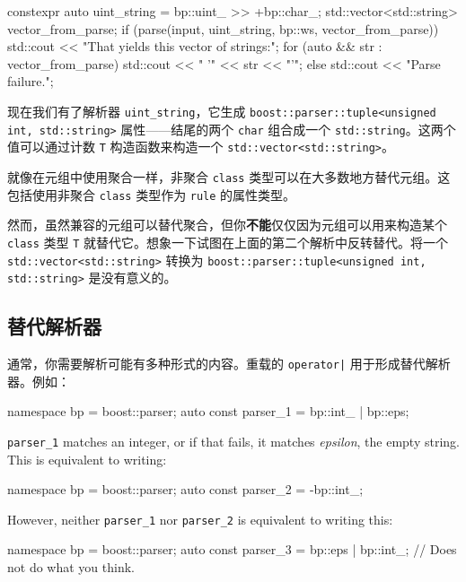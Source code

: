 \begin{code}
constexpr auto uint_string = bp::uint_ >> +bp::char_;
std::vector<std::string> vector_from_parse;
if (parse(input, uint_string, bp::ws, vector_from_parse)) {
    std::cout << "That yields this vector of strings:\n";
    for (auto && str : vector_from_parse) {
        std::cout << "  '" << str << "'\n";
    }
} else {
    std::cout << "Parse failure.\n";
}
\end{code}

现在我们有了解析器 \texttt{uint\_string}，它生成 \texttt{boost::parser::tuple<unsigned int, std::string>} 属性——结尾的两个 \texttt{char} 组合成一个 \texttt{std::string}。这两个值可以通过计数 \texttt{T} 构造函数来构造一个 \texttt{std::vector<std::string>}。

就像在元组中使用聚合一样，非聚合 \texttt{class} 类型可以在大多数地方替代元组。这包括使用非聚合 \texttt{class} 类型作为 \texttt{rule} 的属性类型。

然而，虽然兼容的元组可以替代聚合，但你\textbf{不能}仅仅因为元组可以用来构造某个 \texttt{class} 类型 \texttt{T} 就替代它。想象一下试图在上面的第二个解析中反转替代。将一个 \texttt{std::vector<std::string>} 转换为 \texttt{boost::parser::tuple<unsigned int, std::string>} 是没有意义的。

\subsection{替代解析器}

通常，你需要解析可能有多种形式的内容。重载的 \texttt{operator|} 用于形成替代解析器。例如：

\begin{code}
namespace bp = boost::parser;
auto const parser_1 = bp::int_ | bp::eps;
\end{code}

\texttt{parser\_1} matches an integer, or if that fails, it matches \emph{epsilon}, the empty string. This is equivalent to writing:

\begin{code}
namespace bp = boost::parser;
auto const parser_2 = -bp::int_;
\end{code}

However, neither \texttt{parser\_1} nor \texttt{parser\_2} is equivalent to writing this:

\begin{code}
namespace bp = boost::parser;
auto const parser_3 = bp::eps | bp::int_; // Does not do what you think.
\end{code}

